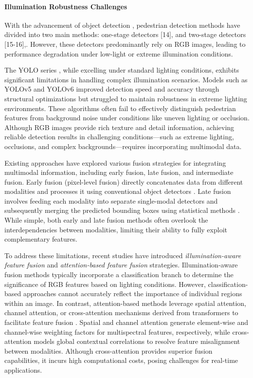 \paragraph{Illumination Robustness Challenges}
With the advancement of object detection \cite{zhang2024meddet,cai2024medical,cai2024msdet}, pedestrian detection methods have divided into two main methods: one-stage detectors [14], and two-stage detectors [15-16],. However, these detectors predominantly rely on RGB images, leading to performance degradation under low-light or extreme illumination conditions.


The YOLO series \cite{6}, while excelling under standard lighting conditions, exhibits significant limitations in handling complex illumination scenarios. Models such as YOLOv5 and YOLOv6 improved detection speed and accuracy through structural optimizations but struggled to maintain robustness in extreme lighting environments. These algorithms often fail to effectively distinguish pedestrian features from background noise under conditions like uneven lighting or occlusion. Although RGB images provide rich texture and detail information, achieving reliable detection results in challenging conditions—such as extreme lighting, occlusions, and complex backgrounds—requires incorporating multimodal data.

Existing approaches have explored various fusion strategies for integrating multimodal information, including early fusion, late fusion, and intermediate fusion. Early fusion (pixel-level fusion) directly concatenates data from different modalities and processes it using conventional object detectors \cite{5,15,17}. Late fusion involves feeding each modality into separate single-modal detectors and subsequently merging the predicted bounding boxes using statistical methods \cite{18,19,20}. While simple, both early and late fusion methods often overlook the interdependencies between modalities, limiting their ability to fully exploit complementary features.

To address these limitations, recent studies have introduced \textit{illumination-aware feature fusion} and \textit{attention-based feature fusion} strategies. Illumination-aware fusion methods \cite{17,21,22,23} typically incorporate a classification branch to determine the significance of RGB features based on lighting conditions. However, classification-based approaches cannot accurately reflect the importance of individual regions within an image. In contrast, attention-based methods leverage spatial attention, channel attention, or cross-attention mechanisms derived from transformers to facilitate feature fusion \cite{9,24,25,26,27,28}. Spatial and channel attention generate element-wise and channel-wise weighting factors for multispectral features, respectively, while cross-attention models global contextual correlations to resolve feature misalignment between modalities. Although cross-attention provides superior fusion capabilities, it incurs high computational costs, posing challenges for real-time applications.